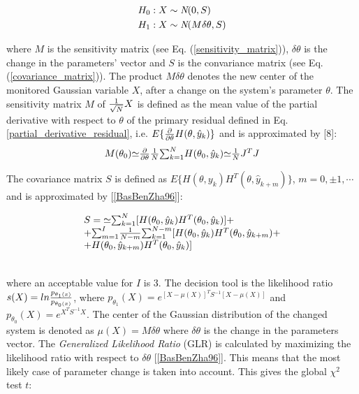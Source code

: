 \documentclass[journal]{IEEEtran}
\begin{document}
\begin{eqnarray*}
& H_0 : X \sim \emph{N}(0,S)  \\
& H_1 : X \sim \emph{N}(M{\delta}{\theta},S)
\end{eqnarray*}

\noindent where $M$ is the sensitivity matrix (see Eq. (\ref{sensitivity_matrix})),
${\delta}{\theta}$ is the change in the parameters' vector and $S$ is the convariance matrix (see Eq.
(\ref{covariance_matrix})). The product $M{{\delta}{\theta}}$  denotes the new center of the
monitored Gaussian variable $X$, after a change on the system's parameter $\theta$.
The sensitivity matrix $M$ of ${1 \over {\sqrt{N}}}X$ is defined as the mean value
of the partial derivative with respect to $\theta$ of the primary residual defined in
Eq. \ref{partial_derivative_residual}, i.e. $E\{{{\partial} \over {{\partial}\theta}}H(\theta,\hat{y}_k)\}$
and is approximated by [8]:\\

\begin{equation} \label{sensitivity_matrix}
\begin{tabular}{c}
$M(\theta_0){\simeq}{{\partial} \over {{\partial}{\theta}}}{1 \over N}{\sum_{k=1}^N}H(\theta_0,\hat{y}_k){\simeq}{1 \over N}{J^T}J$
\end{tabular}
\end{equation}

\noindent The covariance matrix $S$ is defined as $E\{H(\theta,y_k){H^T}(\theta,\hat{y}_{k+m})\}$, $m=0,\pm1,\cdots$ and is approximated by [\ref{BasBenZha96}]:

\begin{equation} \label{covariance_matrix}
\begin{tabular}{l}
$S={\simeq}{\sum_{k=1}^N}[{H(\theta_0,\hat{y}_k)}{H^T(\theta_0,\hat{y}_k)}]+$\\
$+{\sum_{m=1}^I}{1 \over {N-m}}{\sum_{k=1}^{N-m}}[H(\theta_0,\hat{y}_k)H^T(\theta_0,\hat{y}_{k+m})+$\\
$+H(\theta_0,\hat{y}_{k+m})H^T(\theta_0,\hat{y}_k)]$
\end{tabular}
\end{equation}

\noindent \\

\noindent where an acceptable value for $I$ is 3. The decision tool is the likelihood ratio $s(X)=ln{{p_{\theta_1(x)}} \over {p_{\theta_0(x)}}}$, where $p_{\theta_1}(X)=e^{[X-\mu(X)]^T{S^{-1}}[X-\mu(X)]}$ and $p_{\theta_0}(X)=e^{{X^T}{S^{-1}}X}$. The center of the Gaussian distribution of the changed system is denoted as $\mu(X)=M{\delta}{\theta}$ where $\delta{\theta}$ is the change in the parameters vector. The \textit{Generalized Likelihood Ratio} (GLR) is calculated by maximizing the likelihood ratio with respect to
${\delta}{\theta}$ [\ref{BasBenZha96}]. This means that the most likely case of parameter change is taken into account. This gives the global $\chi^2$ test $t$:
\end{document}
